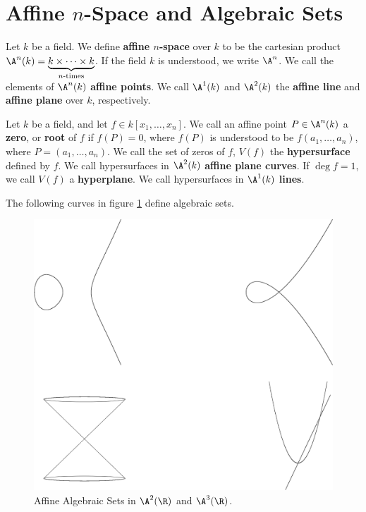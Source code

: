 \section{Affine $n$-Space and Algebraic Sets}\label{section_1.2}

\begin{definition}
    Let $k$ be a field. We define  \textbf{affine $n$-space} over $k$ to be the
    cartesian product  $\A^n(k) = \underbrace{k \times \dots \times
    k}_{n\text{-times}}$. If the field $k$ is understood, we write  $\A^n$. We
    call the elements of  $\A^n(k)$ \textbf{affine points}. We call $\A^1(k)$ and
    $\A^2(k)$ the \textbf{affine line} and \textbf{affine plane} over $k$,
    respectively.
\end{definition}

\begin{definition}
    Let $k$ be a field, and let  $f \in k[x_1, \dots, x_n]$. We call an affine
    point $P \in \A^n(k)$ a \textbf{zero}, or \textbf{root} of $f$ if $f(P)=0$,
    where $f(P)$ is understood to be $f(a_1, \dots, a_n)$, where $P=(a_1, \dots,
    a_n)$. We call the set of zeros of $f$, $V(f)$ the \textbf{hypersurface}
    defined by $f$. We call hypersurfaces in  $\A^2(k)$ \textbf{affine plane
    curves}. If $\deg{f}=1$, we call $V(f)$ a \textbf{hyperplane}. We call
    hypersurfaces in $\A^1(k)$ \textbf{lines}.
\end{definition}

\begin{example}\label{example_1.4}
    The following curves in figure \ref{figure_1.1} define algebraic sets.
    \begin{figure}[h]
        \centering
        \includegraphics[scale=0.5]{Figures/chapter1/hyperplanes.eps}
        \caption{Affine Algebraic Sets in $\A^2(\R)$ and $\A^3(\R)$.}
        \label{figure_1.1}
    \end{figure}
\end{example}

